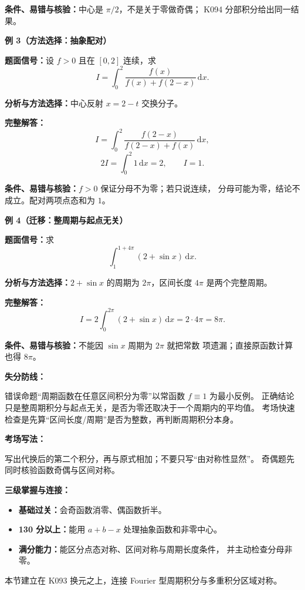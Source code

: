 \begin{knowledgeBox}
\textbf{条件、易错与核验：}中心是 \(\pi/2\)，不是关于零做奇偶；
K094 分部积分给出同一结果。

\textbf{例 3（方法选择：抽象配对）}

\textbf{题面信号：}设 \(f>0\) 且在 \([0,2]\) 连续，求
\[
I=\int_0^2\frac{f(x)}{f(x)+f(2-x)}\,\mathrm dx.
\]

\textbf{分析与方法选择：}中心反射 \(x=2-t\) 交换分子。

\textbf{完整解答：}
\[
I=\int_0^2\frac{f(2-x)}{f(2-x)+f(x)}\,\mathrm dx,
\]
\[
2I=\int_0^2 1\,\mathrm dx=2,\qquad \boxed{I=1}.
\]

\textbf{条件、易错与核验：}\(f>0\) 保证分母不为零；若只说连续，
分母可能为零，结论不成立。配对两项点态和为 \(1\)。

\textbf{例 4（迁移：整周期与起点无关）}

\textbf{题面信号：}求
\[
\int_1^{1+4\pi}(2+\sin x)\,\mathrm dx.
\]

\textbf{分析与方法选择：}\(2+\sin x\) 的周期为 \(2\pi\)，区间长度
\(4\pi\) 是两个完整周期。

\textbf{完整解答：}
\[
I=2\int_0^{2\pi}(2+\sin x)\,\mathrm dx
=2\cdot4\pi=8\pi.
\]

\textbf{条件、易错与核验：}不能因 \(\sin x\) 周期为 \(2\pi\) 就把常数
项遗漏；直接原函数计算也得 \(8\pi\)。

\textbf{失分防线：}

错误命题“周期函数在任意区间积分为零”以常函数 \(f\equiv1\) 为最小反例。
正确结论只是整周期积分与起点无关，是否为零还取决于一个周期内的平均值。
考场快速检查是先算“区间长度/周期”是否为整数，再判断周期积分本身。

\textbf{考场写法：}

写出代换后的第二个积分，再与原式相加；不要只写“由对称性显然”。
奇偶题先同时核验函数奇偶与区间对称。

\textbf{三级掌握与连接：}
\begin{itemize}
  \item \textbf{基础过关：}会奇函数消零、偶函数折半。
  \item \textbf{130 分以上：}能用 \(a+b-x\) 处理抽象函数和非零中心。
  \item \textbf{满分能力：}能区分点态对称、区间对称与周期长度条件，
  并主动检查分母非零。
\end{itemize}
本节建立在 K093 换元之上，连接 Fourier 型周期积分与多重积分区域对称。
\end{knowledgeBox}



